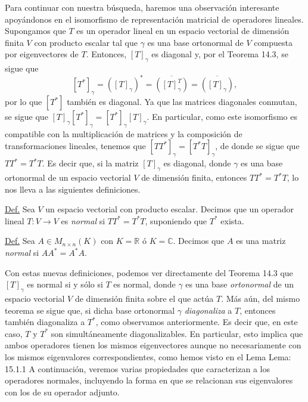 \documentclass[12pt,libertine]{book}
\begin{document}
\vspace{3mm}
Para continuar con nuestra búsqueda, haremos una observación interesante apoyándonos en el isomorfismo de representación matricial de operadores lineales. Supongamos que $T$ es un operador lineal en un espacio vectorial de dimensión finita $V$ con producto escalar tal que $\gamma$ es una base ortonormal de $V$ compuesta por eigenvectores de $T$. Entonces, $[T]_\gamma$ es diagonal y, por el Teorema 14.3, se sigue que $$[T^*]_\gamma=([T]_\gamma)^*=\overline{([T]_\gamma^T)}=\overline{
([T]_\gamma)},$$ por lo que $[T^*]$ también es diagonal. Ya que las matrices diagonales conmutan, se sigue que $[T]_\gamma[T^*]_\gamma=[T^*]_\gamma[T]_\gamma$. En particular, como este isomorfismo es compatible con la multiplicación de matrices y la composición de transformaciones lineales, tenemos que $[TT^*]_\gamma=[T^*T]_\gamma$, de donde se sigue que $TT^*=T^*T$. Es decir que, si la matriz $[T]_\gamma$ es diagonal, donde $\gamma$ es una base ortonormal de un espacio vectorial $V$ de dimensión finita, entonces $TT^*=T^*T$, lo nos lleva a las siguientes definiciones.

\begin{tcolorbox}
    \underline{Def.} Sea $V$ un espacio vectorial con producto escalar. Decimos que un operador lineal $T:V\to V$ es \emph{normal} si $TT^*=T^*T$, suponiendo que $T^*$ exista.

    \vspace{3mm}
    \underline{Def.} Sea $A\in M_{n\times n}(K)$ con $K=\mathbb{R}$ ó $K=\mathbb{C}$. Decimos que $A$ es una matriz \emph{normal} si $AA^*=A^*A$.
\end{tcolorbox}

Con estas nuevas definiciones, podemos ver directamente del Teorema 14.3 que $[T]_\gamma$ es normal si y sólo si $T$ es normal, donde $\gamma$ es una base \emph{ortonormal} de un espacio vectorial $V$ de dimensión finita sobre el que actúa $T$. Más aún, del mismo teorema se sigue que, si dicha base ortonormal $\gamma$ \emph{diagonaliza} a $T$, entonces también diagonaliza a $T^*$, como observamos anteriormente. Es decir que, en este caso, $T$ y $T^*$ son simultáneamente diagonalizables. En particular, esto implica que ambos operadores tienen los mismos eigenvectores \textemdash aunque no necesariamente con los mismos eigenvalores correspondientes, como hemos visto en el Lema Lema: 15.1.1 A continuación, veremos varias propiedades que caracterizan a los operadores normales, incluyendo la forma en que se relacionan sus eigenvalores con los de su operador adjunto.
\end{document}
